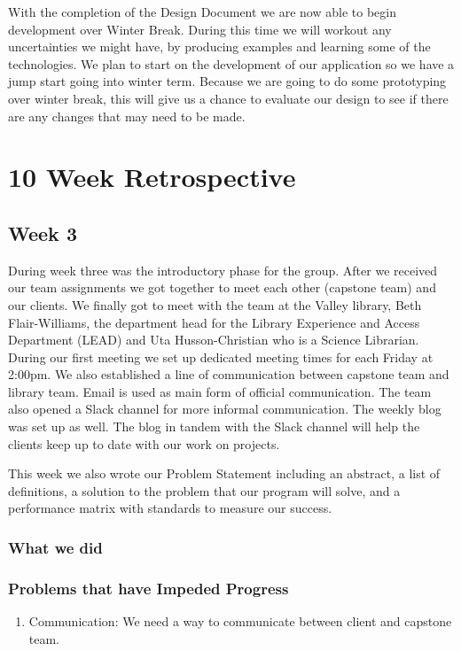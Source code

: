 \documentclass[letterpaper,10pt,titlepage, onecolumn, compsoc]{IEEEtran}
\begin{document}
With the completion of the Design Document we are now able to begin development over Winter Break. During this time we will workout any uncertainties we might have, by producing examples and learning some of the technologies. We plan to start on the development of our application so we have a jump start going into winter term. Because we are going to do some prototyping over winter break, this will give us a chance to evaluate our design to see if there are any changes that may need to be made.

\section{10 Week Retrospective}

\subsection{Week 3}
During week three was the introductory phase for the group. After we received our team assignments we got together to meet each other (capstone team) and our clients. We finally got to meet with the team at the Valley library, Beth Flair-Williams, the department head for the Library Experience and Access Department (LEAD) and Uta Husson-Christian who is a Science Librarian. During our first meeting we set up dedicated meeting times for each Friday at 2:00pm. We also established a line of communication between capstone team and library team. Email is used as main form of official communication. The team also opened a Slack channel for more informal communication. The weekly blog was set up as well. The blog in tandem with the Slack channel will help the clients keep up to date with our work on projects.  

This week we also wrote our Problem Statement including an abstract, a list of definitions, a solution to the problem that our program will solve, and a performance matrix with standards to measure our success. 

\subsubsection{What we did}

\subsubsection{Problems that have Impeded Progress}
\begin{enumerate}
	\item Communication: We need a way to communicate between client and capstone team.
\end{enumerate}
\end{document}
